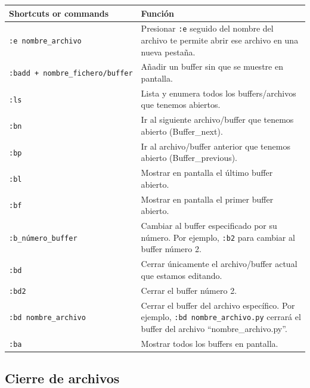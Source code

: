 \documentclass[
  doc,
  floatsintext,
  longtable,
  a4paper,
  nolmodern,
  notxfonts,
  notimes,
  12pt,
  colorlinks=true,linkcolor=blue,citecolor=blue,urlcolor=blue]{apa7}
\newcounter{none} %
\begin{document}
{\def\LTcaptype{none} %
\begin{longtable}[]{@{}
  >{\raggedright\arraybackslash}p{}
  >{\raggedright\arraybackslash}p{}@{}}
\toprule\noalign{}
\begin{minipage}[b]{\linewidth}\raggedright
Shortcuts or commands
\end{minipage} & \begin{minipage}[b]{\linewidth}\raggedright
Función
\end{minipage} \\
\midrule\noalign{}
\endhead
\bottomrule\noalign{}
\endlastfoot
\texttt{:e\ nombre\_archivo} & Presionar \texttt{:e} seguido del nombre
del archivo te permite abrir ese archivo en una nueva pestaña. \\
\texttt{:badd\ +\ nombre\_fichero/buffer} & Añadir un buffer sin que se
muestre en pantalla. \\
\texttt{:ls} & Lista y enumera todos los buffers/archivos que tenemos
abiertos. \\
\texttt{:bn} & Ir al siguiente archivo/buffer que tenemos abierto
(Buffer\_next). \\
\texttt{:bp} & Ir al archivo/buffer anterior que tenemos abierto
(Buffer\_previous). \\
\texttt{:bl} & Mostrar en pantalla el último buffer abierto. \\
\texttt{:bf} & Mostrar en pantalla el primer buffer abierto. \\
\texttt{:b\_número\_buffer} & Cambiar al buffer especificado por su
número. Por ejemplo, \texttt{:b2} para cambiar al buffer número 2. \\
\texttt{:bd} & Cerrar únicamente el archivo/buffer actual que estamos
editando. \\
\texttt{:bd2} & Cerrar el buffer número 2. \\
\texttt{:bd\ nombre\_archivo} & Cerrar el buffer del archivo específico.
Por ejemplo, \texttt{:bd\ nombre\_archivo.py} cerrará el buffer del
archivo ``nombre\_archivo.py''. \\
\texttt{:ba} & Mostrar todos los buffers en pantalla. \\
\end{longtable}
}

\subsection{Cierre de archivos}\label{cierre-de-archivos}
\end{document}
